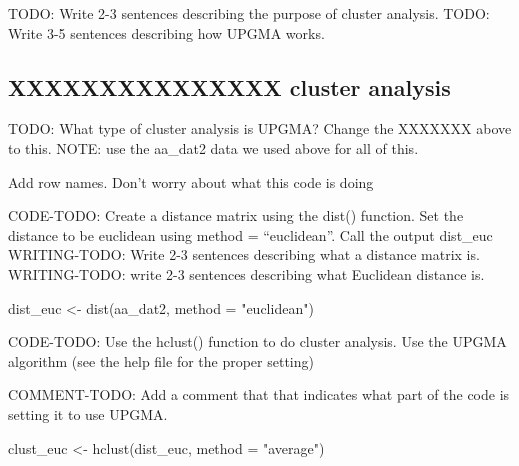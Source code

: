 \documentclass[
]{book}
\newenvironment{Shaded}{\begin{snugshade}}{\end{snugshade}}
\newcommand{\AttributeTok}[1]{\textcolor[rgb]{0.77,0.63,0.00}{#1}}
\newcommand{\CommentTok}[1]{\textcolor[rgb]{0.56,0.35,0.01}{\textit{#1}}}
\newcommand{\FunctionTok}[1]{\textcolor[rgb]{0.00,0.00,0.00}{#1}}
\newcommand{\NormalTok}[1]{#1}
\newcommand{\OtherTok}[1]{\textcolor[rgb]{0.56,0.35,0.01}{#1}}
\newcommand{\SpecialCharTok}[1]{\textcolor[rgb]{0.00,0.00,0.00}{#1}}
\newcommand{\StringTok}[1]{\textcolor[rgb]{0.31,0.60,0.02}{#1}}
\begin{document}
TODO: Write 2-3 sentences describing the purpose of cluster analysis.
TODO: Write 3-5 sentences describing how UPGMA works.

\hypertarget{xxxxxxxxxxxxxxx-cluster-analysis-1}{%
\subsection{XXXXXXXXXXXXXXX cluster analysis}\label{xxxxxxxxxxxxxxx-cluster-analysis-1}}

TODO: What type of cluster analysis is UPGMA? Change the XXXXXXX above to this.
NOTE: use the aa\_dat2 data we used above for all of this.

Add row names. Don't worry about what this code is doing

\begin{Shaded}
\end{Shaded}

CODE-TODO: Create a distance matrix using the dist() function. Set the distance to be euclidean using method = ``euclidean''. Call the output dist\_euc
WRITING-TODO: Write 2-3 sentences describing what a distance matrix is.
WRITING-TODO: write 2-3 sentences describing what Euclidean distance is.

\begin{Shaded}
\begin{Highlighting}[]
\NormalTok{dist\_euc }\OtherTok{\textless{}{-}} \FunctionTok{dist}\NormalTok{(aa\_dat2, }
                 \AttributeTok{method =} \StringTok{"euclidean"}\NormalTok{)}
\end{Highlighting}
\end{Shaded}

CODE-TODO: Use the hclust() function to do cluster analysis. Use the UPGMA algorithm (see the help file for the proper setting)

COMMENT-TODO: Add a comment that that indicates what part of the code is setting it to use UPGMA.

\begin{Shaded}
\begin{Highlighting}[]
\NormalTok{clust\_euc }\OtherTok{\textless{}{-}} \FunctionTok{hclust}\NormalTok{(dist\_euc,}
                    \AttributeTok{method =} \StringTok{"average"}\NormalTok{)}
\end{Highlighting}
\end{Shaded}
\end{document}
